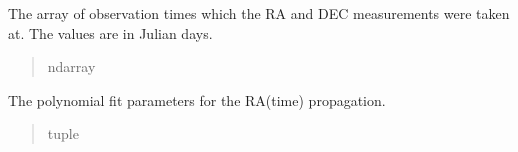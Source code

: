 \documentclass[letterpaper,11pt,english]{sphinxmanual}
\begin{document}
\begin{savenotes}
\begin{fulllineitems}
\begin{savenotes}
\begin{fulllineitems}
\begin{quote}
\begin{description}
\end{description}\end{quote}

\end{fulllineitems}\end{savenotes}


\begin{savenotes}\begin{fulllineitems}
\label{\detokenize{code/opihiexarata.propagate.polynomial:opihiexarata.propagate.polynomial.LinearPropagationEngine.obs_time_array}}
\pysigstartsignatures
{}
\pysigstopsignatures
\sphinxAtStartPar
The array of observation times which the RA and DEC measurements were
taken at. The values are in Julian days.
\begin{quote}\begin{description}
\sphinxAtStartPar
ndarray

\end{description}\end{quote}

\end{fulllineitems}\end{savenotes}


\begin{savenotes}\begin{fulllineitems}
\label{\detokenize{code/opihiexarata.propagate.polynomial:opihiexarata.propagate.polynomial.LinearPropagationEngine.ra_poly_param}}
\pysigstartsignatures
{}
\pysigstopsignatures
\sphinxAtStartPar
The polynomial fit parameters for the RA(time) propagation.
\begin{quote}\begin{description}
\sphinxAtStartPar
tuple

\end{description}\end{quote}

\end{fulllineitems}\end{savenotes}


\end{fulllineitems}
\end{savenotes}
\end{document}
